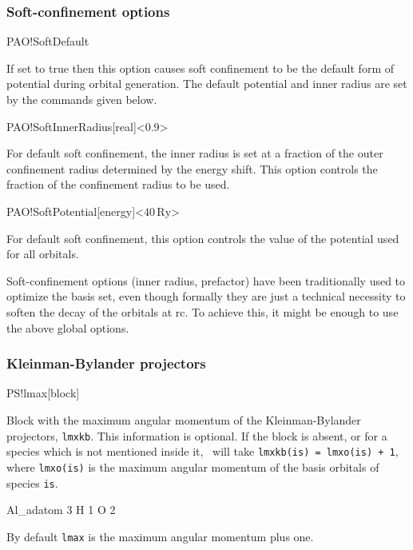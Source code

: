 \subsubsection{Soft-confinement options}

\begin{fdflogicalF}{PAO!SoftDefault}

  If set to true then this option causes soft confinement to be the
  default form of potential during orbital generation. The default
  potential and inner radius are set by the commands given below.

\end{fdflogicalF}

\begin{fdfentry}{PAO!SoftInnerRadius}[real]<$0.9$>

  For default soft confinement, the inner radius is set at a fraction
  of the outer confinement radius determined by the energy shift. This
  option controls the fraction of the confinement radius to be used.
  
\end{fdfentry}

\begin{fdfentry}{PAO!SoftPotential}[energy]<$40\,\mathrm{Ry}$>

  For default soft confinement, this option controls the value of the
  potential used for all orbitals.

  \note Soft-confinement options (inner radius, prefactor) have been
  traditionally used to optimize the basis set, even though formally
  they are just a technical necessity to soften the decay of the
  orbitals at rc. To achieve this, it might be enough to use the above
  global options.
  
\end{fdfentry}


\subsubsection{Kleinman-Bylander projectors}


\begin{fdfentry}{PS!lmax}[block]

  Block with the maximum angular momentum of the Kleinman-Bylander
  projectors, \texttt{lmxkb}.
  This information is optional. If the block is absent, or for a
  species which is not mentioned inside it, \siesta\ will take
  \texttt{lmxkb(is) = lmxo(is) + 1}, where \texttt{lmxo(is)} is the
  maximum angular momentum of the basis orbitals of species
  \texttt{is}.
  \begin{fdfexample}
          Al_adatom   3
          H           1
          O           2
  \end{fdfexample}
  
  By default \texttt{lmax} is the maximum angular momentum plus one.

\end{fdfentry}


